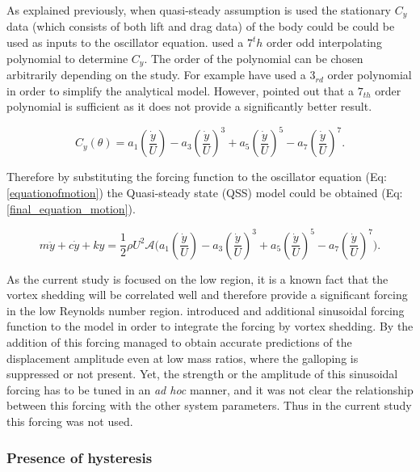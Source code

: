 As explained previously, when quasi-steady assumption is used the stationary $C_y$ data (which consists of both lift and drag data)  of the body could be could be used as inputs to the oscillator equation.\citet{Parkinson1964} used a $7^th$ order odd interpolating polynomial to determine $C_y$. The order of the polynomial can be chosen arbitrarily depending on the study. For example \citet{Barrero-Gil2009,Barrero-Gil2010a} have used a $3_{rd}$ order polynomial in order to simplify the analytical model. However, \citet{Ng2005} pointed out that a $7_{th}$ order polynomial is sufficient as it does not provide a significantly better result.    

\begin{equation}
\label{cy ploynomial}
C_y(\theta)=a_1\left(\frac{\dot{y}}{U}\right)-a_3\left(\frac{\dot{y}}{U}\right)^3+a_5\left(\frac{\dot{y}}{U}\right)^5-a_7\left(\frac{\dot{y}}{U}\right)^7.
\end{equation}

Therefore by substituting the forcing function to the oscillator equation (Eq:\ref{equationofmotion}) the Quasi-steady state (QSS) model could be obtained (Eq:\ref{final_equation_motion}). 

\begin{equation}
\label{final_equation_motion}
m\ddot{y}{+}c\dot{y}{+}ky{=}\frac{1}{2}\rho U^2 \mathcal {A} \Bigg(a_1\left(\frac{\dot{y}}{U}\right){-}a_3\left(\frac{\dot{y}}{U}\right)^3{+}a_5\left(\frac{\dot{y}}{U}\right)^5{-}a_7\left(\frac{\dot{y}}{U}\right)^7 \Bigg).
\end{equation}

As the current study is focused on the low \reynoldsnumber region, it is a known fact that the vortex shedding will be correlated well and therefore provide a significant forcing in the low Reynolds number region. \citet{Joly2012} introduced and additional sinusoidal forcing function to the model in order to integrate the forcing by vortex shedding. By the addition of this forcing \citet{Joly2012} managed to obtain accurate predictions of the displacement amplitude even at low mass ratios, where the galloping is suppressed or not present. Yet, the strength or the amplitude of this sinusoidal forcing has to be tuned in an \emph{ad hoc} manner, and it was not clear the relationship between this forcing with the other system parameters. Thus in the current study this forcing was not used.

\subsubsection*{Presence of hysteresis}

